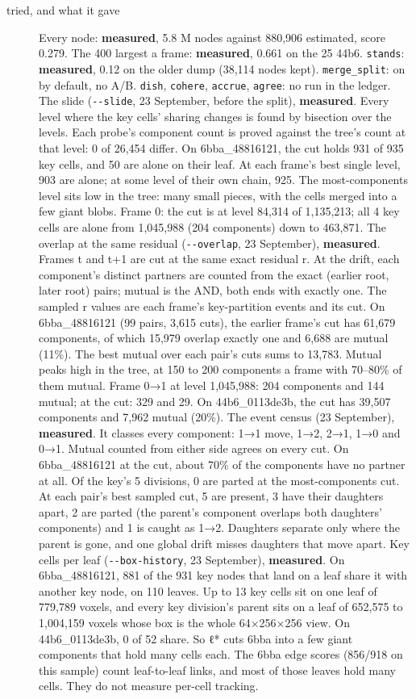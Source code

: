 \begin{description}
\item[{tried, and what it gave}] Every node: \textbf{measured}, 5.8 M nodes against 880,906 estimated, score 0.279. The 400 largest a frame: \textbf{measured}, 0.661 on the 25 44b6. \texttt{stands}: \textbf{measured}, 0.12 on the older dump (38,114 nodes kept). \texttt{merge\_\allowbreak{}split}: on by default, no A/B. \texttt{dish}, \texttt{cohere}, \texttt{accrue}, \texttt{agree}: no run in the ledger. The slide (\texttt{-\allowbreak{}-\allowbreak{}slide}, 23 September, before the split), \textbf{measured}. Every level where the key cells' sharing changes is found by bisection over the levels. Each probe's component count is proved against the tree's count at that level: 0 of 26,454 differ. On 6bba\_\allowbreak{}48816121, the cut holds 931 of 935 key cells, and 50 are alone on their leaf. At each frame's best single level, 903 are alone; at some level of their own chain, 925. The most-components level sits low in the tree: many small pieces, with the cells merged into a few giant blobs. Frame 0: the cut is at level 84,314 of 1,135,213; all 4 key cells are alone from 1,045,988 (204 components) down to 463,871. The overlap at the same residual (\texttt{-\allowbreak{}-\allowbreak{}overlap}, 23 September), \textbf{measured}. Frames t and t+1 are cut at the same exact residual r. At the drift, each component's distinct partners are counted from the exact (earlier root, later root) pairs; mutual is the AND, both ends with exactly one. The sampled r values are each frame's key-partition events and its cut. On 6bba\_\allowbreak{}48816121 (99 pairs, 3,615 cuts), the earlier frame's cut has 61,679 components, of which 15,979 overlap exactly one and 6,688 are mutual (11\%). The best mutual over each pair's cuts sums to 13,783. Mutual peaks high in the tree, at 150 to 200 components a frame with 70–80\% of them mutual. Frame 0→1 at level 1,045,988: 204 components and 144 mutual; at the cut: 329 and 29. On 44b6\_\allowbreak{}0113de3b, the cut has 39,507 components and 7,962 mutual (20\%). The event census (23 September), \textbf{measured}. It classes every component: 1→1 move, 1→2, 2→1, 1→0 and 0→1. Mutual counted from either side agrees on every cut. On 6bba\_\allowbreak{}48816121 at the cut, about 70\% of the components have no partner at all. Of the key's 5 divisions, 0 are parted at the most-components cut. At each pair's best sampled cut, 5 are present, 3 have their daughters apart, 2 are parted (the parent's component overlaps both daughters' components) and 1 is caught as 1→2. Daughters separate only where the parent is gone, and one global drift misses daughters that move apart. Key cells per leaf (\texttt{-\allowbreak{}-\allowbreak{}box-\allowbreak{}history}, 23 September), \textbf{measured}. On 6bba\_\allowbreak{}48816121, 881 of the 931 key nodes that land on a leaf share it with another key node, on 110 leaves. Up to 13 key cells sit on one leaf of 779,789 voxels, and every key division's parent sits on a leaf of 652,575 to 1,004,159 voxels whose box is the whole 64×256×256 view. On 44b6\_\allowbreak{}0113de3b, 0 of 52 share. So ℓ* cuts 6bba into a few giant components that hold many cells each. The 6bba edge scores (856/918 on this sample) count leaf-to-leaf links, and most of those leaves hold many cells. They do not measure per-cell tracking.

\end{description}
